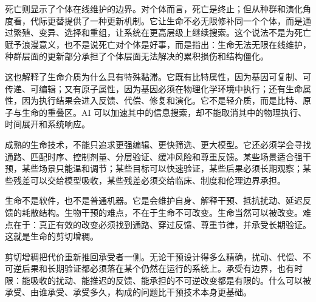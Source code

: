 死亡则显示了个体在线维护的边界。对个体而言，死亡是终止；但从种群和演化角度看，代际更替提供了一种更新机制。它让生命不必无限修补同一个个体，而是通过繁殖、变异、选择和重组，让系统在更高层级上继续搜索。这个说法不是为死亡赋予浪漫意义，也不是说死亡对个体是好事，而是指出：生命无法无限在线维护，种群层面的更新部分承担了个体层面无法解决的累积损伤和结构僵化。

这也解释了生命介质为什么具有特殊黏滞。它既有比特属性，因为基因可复制、可传递、可编辑；又有原子属性，因为基因必须在物理化学环境中执行；还有生命属性，因为执行结果会进入反馈、代偿、修复和演化。它不是轻介质，而是比特、原子与生命的重叠区。AI 可以加速其中的信息搜索，却不能取消其中的物理执行、时间展开和系统响应。

成熟的生命技术，不能只追求更强编辑、更快筛选、更大模型。它还必须学会寻找通路、匹配时序、控制剂量、分层验证、缓冲风险和尊重反馈。某些场景适合强干预，某些场景只能温和调节；某些目标可以快速验证，某些后果必须长期观察；某些残差可以交给模型吸收，某些残差必须交给临床、制度和伦理边界承担。

生命不是软件，也不是普通机器。它是会维护自身、解释干预、抵抗扰动、延迟反馈的耗散结构。生物干预的难点，不在于生命不可改变。生命当然可以被改变。难点在于：真正有效的改变必须找到通路、穿过反馈、尊重节律，并承受长期验证。这就是生命的剪切增稠。

剪切增稠把代价重新推回承受者一侧。无论干预设计得多么精确，扰动、代偿、不可逆后果和长期验证都必须落在某个仍然在运行的系统上。承受有边界，也有时限：能吸收的扰动、能推迟的反馈、能承担的不可逆改变都是有限的。什么可以被承受、由谁承受、承受多久，构成的问题比干预技术本身更基础。
